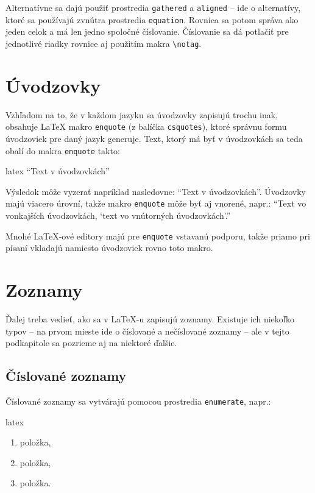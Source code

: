 Alternatívne sa dajú použiť prostredia \texttt{gathered} a \texttt{aligned} -- ide o alternatívy, ktoré sa používajú zvnútra prostredia \texttt{equation}. Rovnica sa potom správa ako jeden celok a má len jedno spoločné číslovanie. Číslovanie sa dá potlačiť pre jednotlivé riadky rovnice aj použitím makra \texttt{{\textbackslash}notag}.

\section{Úvodzovky}

Vzhľadom na to, že v každom jazyku sa úvodzovky zapisujú trochu inak, obsahuje LaTeX makro \texttt{enquote} (z balíčka \texttt{csquotes}), ktoré správnu formu úvodzoviek pre daný jazyk generuje. Text, ktorý má byť v úvodzovkách sa teda obalí do makra \texttt{enquote} takto:
\begin{inlinecode}{latex}
\enquote{Text v úvodzovkách}
\end{inlinecode}

Výsledok môže vyzerať napríklad nasledovne: \enquote{Text v úvodzovkách}. Úvodzovky majú viacero úrovní, takže makro \texttt{enquote} môže byť aj vnorené, napr.: \enquote{Text vo vonkajších úvodzovkách, \enquote{text vo vnútorných úvodzovkách}.}

Mnohé LaTeX-ové editory majú pre \texttt{enquote} vstavanú podporu, takže priamo pri písaní vkladajú namiesto úvodzoviek rovno toto makro.

\section{Zoznamy}

Ďalej treba vedieť, ako sa v LaTeX-u zapisujú zoznamy. Existuje ich niekoľko typov -- na prvom mieste ide o číslované a nečíslované zoznamy -- ale v tejto podkapitole sa pozrieme aj na niektoré ďalšie.

\subsection{Číslované zoznamy}

Číslované zoznamy sa vytvárajú pomocou prostredia \texttt{enumerate}, napr.:
\begin{inlinecode}{latex}
\begin{enumerate}
\item položka,
\item položka,
\item položka.
\end{enumerate}
\end{inlinecode}

